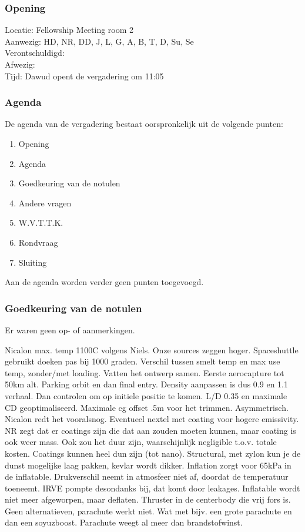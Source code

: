 \subsubsection{Opening}
Locatie: Fellowship Meeting room 2\\
Aanwezig: HD, NR, DD, J, L, G, A, B, T, D, Su, Se\\
Verontschuldigd: \\
Afwezig: \\
Tijd: Dawud opent de vergadering om 11:05\\

\subsubsection{Agenda}
De agenda van de vergadering bestaat oorspronkelijk uit de volgende punten:
\begin{enumerate}
\item Opening
\item Agenda
\item Goedkeuring van de notulen
\item Andere vragen
\item W.V.T.T.K.
\item Rondvraag
\item Sluiting
\end{enumerate}

Aan de agenda worden verder geen punten toegevoegd.

\subsubsection{Goedkeuring van de notulen}
Er waren geen op- of aanmerkingen.

Nicalon max. temp 1100C volgens Niels. Onze sources zeggen hoger. Spaceshuttle gebruikt doeken pas bij 1000 graden. Verschil tussen smelt temp en max use temp, zonder/met loading. 
Vatten het ontwerp samen. Eerste aerocapture tot 50km alt. Parking orbit en dan final entry. Density aanpassen is dus 0.9 en 1.1 verhaal. Dan controlen om op initiele positie te komen. 
L/D 0.35 en maximale CD geoptimaliseerd. Maximale cg offset .5m voor het trimmen. Asymmetrisch. 
Nicalon redt het vooralsnog. Eventueel nextel met coating voor hogere emissivity. NR zegt dat er coatings zijn die dat aan zouden moeten kunnen, maar coating is ook weer mass. Ook zou het duur zijn, waarschijnlijk negligible t.o.v. totale kosten. Coatings kunnen heel dun zijn (tot nano).
Structural, met zylon kun je de dunst mogelijke laag pakken, kevlar wordt dikker. Inflation zorgt voor 65kPa in de inflatable. Drukverschil neemt in atmosfeer niet af, doordat de temperatuur toeneemt. IRVE pompte desondanks bij, dat komt door leakages. Inflatable wordt niet meer afgeworpen, maar deflaten. Thruster in de centerbody die vrij fors is. Geen alternatieven, parachute werkt niet. Wat met bijv. een grote parachute en dan een soyuzboost. Parachute weegt al meer dan brandstofwinst. 


